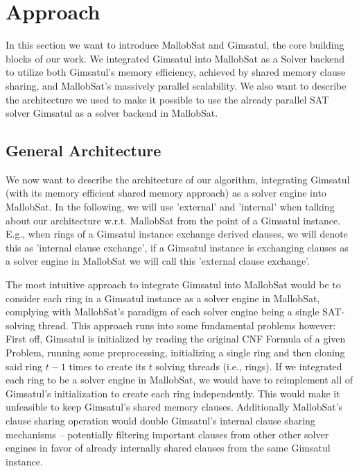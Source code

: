 \documentclass[12pt,a4paper,twoside]{scrartcl}
\numberwithin{equation}{section}
\begin{document}

\section{Approach}

In this section we want to introduce MallobSat and Gimsatul, the core building blocks of our work. We integrated Gimsatul into MallobSat as a Solver backend to utilize both Gimsatul's memory efficiency, achieved by shared memory clause sharing, and MallobSat's massively parallel scalability. We also want to describe the architecture we used to make it possible to use the already parallel SAT solver Gimsatul as a solver backend in MallobSat.

\subsection{General Architecture}

We now want to describe the architecture of our algorithm, integrating Gimsatul (with its memory efficient shared memory approach) as a solver engine into MallobSat. In the following, we will use 'external' and 'internal' when talking about our architecture w.r.t. MallobSat from the point of a Gimsatul instance. E.g., when rings of a Gimsatul instance exchange derived clauses, we will denote this as 'internal clause exchange', if a Gimsatul instance is exchanging clauses as a solver engine in MallobSat we will call this 'external clause exchange'.

The most intuitive approach to integrate Gimsatul into MallobSat would be to consider each ring in a Gimsatul instance as a solver engine in MallobSat, complying with MallobSat's paradigm of each solver engine being a single SAT-solving thread. This approach runs into some fundamental problems however: 
First off, Gimsatul is initialized by reading the original CNF Formula of a given Problem, running some preprocessing, initializing a single ring and then cloning said ring $t - 1$ times to create its $t$ solving threads (i.e., rings). If we integrated each ring to be a solver engine in MallobSat, we would have to reimplement all of Gimsatul's initialization to create each ring independently. This would make it unfeasible to keep Gimsatul's shared memory clauses. Additionally MallobSat's clause sharing operation would double Gimsatul's internal clause sharing mechanisms -- potentially filtering important clauses from other other solver engines in favor of already internally shared clauses from the same Gimsatul instance.
\end{document}
